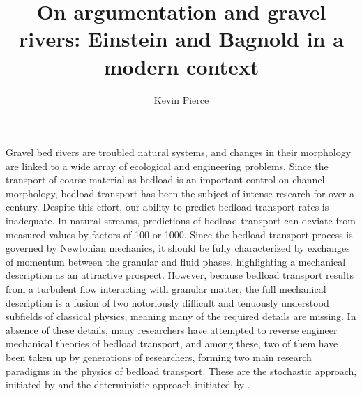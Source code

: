 \documentclass{article}
\begin{document}
\title{On argumentation and gravel rivers: Einstein and Bagnold in a modern context}
\author{Kevin Pierce}
\maketitle


Gravel bed rivers are troubled natural systems, and changes in their morphology are linked to a wide array of ecological and engineering problems.
Since the transport of coarse material as bedload is an important control on channel morphology, bedload transport has been the subject of intense research for over a century. 
Despite this effort, our ability to predict bedload transport rates is inadequate.  
In natural streams, predictions of bedload transport can deviate from measured values by factors of 100 or 1000. 
Since the bedload transport process is governed by Newtonian mechanics, it should be fully characterized by exchanges of momentum between the granular and fluid phases, highlighting a mechanical description as an attractive prospect.
However, because bedload transport results from a turbulent flow interacting with granular matter, the full mechanical description is a fusion of two notoriously difficult and tenuously understood subfields of classical physics, meaning many of the required details are missing.
In absence of these details, many researchers have attempted to reverse engineer mechanical theories of bedload transport, and among these, two of them have been taken up by generations of researchers, forming two main research paradigms in the physics of bedload transport. 
These are the stochastic approach, initiated by \citet{Einstein1937, Einstein1950, Einstein1964} and the deterministic approach initiated by \citet{Bagnold1956, Bagnold1966, Bagnold1973}. 
\end{document}
